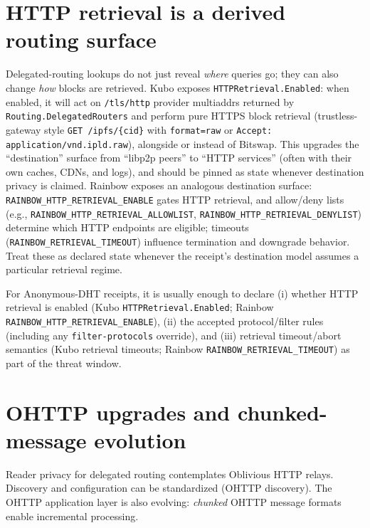 \documentclass[11pt]{article}
\begin{document}
\section{HTTP retrieval is a derived routing surface}
Delegated-routing lookups do not just reveal \emph{where} queries go; they can also change \emph{how} blocks are retrieved.
Kubo exposes \texttt{HTTPRetrieval.Enabled}: when enabled, it will act on \texttt{/tls/http} provider multiaddrs returned by \texttt{Routing.DelegatedRouters} and perform pure HTTPS block retrieval (trustless-gateway style \texttt{GET /ipfs/\{cid\}} with \texttt{format=raw} or \texttt{Accept: application/vnd.ipld.raw}), alongside or instead of Bitswap.\cite{kuboConfigHTTPRetrieval,trustlessGatewaySpec}
This upgrades the ``destination'' surface from ``libp2p peers'' to ``HTTP services'' (often with their own caches, CDNs, and logs), and should be pinned as state whenever destination privacy is claimed.
Rainbow exposes an analogous destination surface: \texttt{RAINBOW\_HTTP\_RETRIEVAL\_ENABLE} gates HTTP retrieval, and allow/deny lists (e.g., \texttt{RAINBOW\_HTTP\_RETRIEVAL\_ALLOWLIST}, \texttt{RAINBOW\_HTTP\_RETRIEVAL\_DENYLIST}) determine which HTTP endpoints are eligible; timeouts (\texttt{RAINBOW\_RETRIEVAL\_TIMEOUT}) influence termination and downgrade behavior. Treat these as declared state whenever the receipt's destination model assumes a particular retrieval regime.\cite{rainbowEnvVars}


For Anonymous-DHT receipts, it is usually enough to declare (i) whether HTTP retrieval is enabled (Kubo \texttt{HTTPRetrieval.Enabled}; Rainbow \texttt{RAINBOW\_HTTP\_RETRIEVAL\_ENABLE}), (ii) the accepted protocol/filter rules (including any \texttt{filter-protocols} override)\cite{ipip0484,kuboEnvVars}, and (iii) retrieval timeout/abort semantics (Kubo retrieval timeouts; Rainbow \texttt{RAINBOW\_RETRIEVAL\_TIMEOUT}) as part of the threat window.\cite{series:threatwindows,rainbowEnvVars}

\section{OHTTP upgrades and chunked-message evolution}
Reader privacy for delegated routing contemplates Oblivious HTTP relays.\cite{rfc9458OHTTP,ipip0421Draft}
Discovery and configuration can be standardized (OHTTP discovery).\cite{rfc9540OHTTPDiscovery}
The OHTTP application layer is also evolving: \emph{chunked} OHTTP message formats enable incremental processing.\cite{draftChunkedOHTTP}
\end{document}
